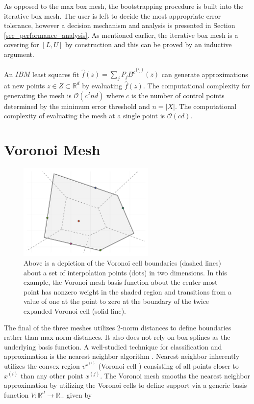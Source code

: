As opposed to the max box mesh, the bootstrapping procedure is built into the iterative box mesh. The user is left to decide the most appropriate error tolerance, however a decision mechanism and analysis is presented in Section \ref{sec_performance_analysis}. As mentioned earlier, the iterative box mesh is a covering for $[L,U]$ by construction and this can be proved by an inductive argument.

An $IBM$ least squares fit $\hat f(z) = \sum_{j}P_j B^{c^{(i_j)}}(z)$ can generate approximations at new points $z \in Z \subset \mathbb{R}^d$ by evaluating $\hat f(z)$. The computational complexity for generating the mesh is $\mathcal{O}(c^2 n d)$ where $c$ is the number of control points determined by the minimum error threshold and $n = |X|$. The computational complexity of evaluating the mesh at a single point is $\mathcal{O}(c d)$.

\section{Voronoi Mesh}


\begin{figure}
  \centering
  \includegraphics[width=0.6\textwidth,]{Figures/NA/VM_Construction.pdf}
  \caption{Above is a depiction of the Voronoi cell
    boundaries (dashed lines) about a set of interpolation points
    (dots) in two dimensions. In this example, the Voronoi mesh basis
    function about the center most point has nonzero weight in the
    shaded region and transitions from a value of one at the point to
    zero at the boundary of the twice expanded Voronoi cell (solid
    line).
  \vspace{-.1cm}}
  \label{fig:voronoi-basis}
\end{figure}

The final of the three meshes utilizes 2-norm distances to define boundaries rather than max norm distances. It also does not rely on box splines as the underlying basis function. A well-studied technique for classification and approximation is the nearest neighbor algorithm \cite{cover1967nearest}. Nearest neighbor inherently utilizes the convex region $v^{x^{(i)}}$ (Voronoi cell \cite{dirichlet1850reduction}) consisting of all points closer to $x^{(i)}$ than any other point $x^{(j)}$. The Voronoi mesh smooths the nearest neighbor approximation by utilizing the Voronoi cells to define support via a generic basis function $V: \mathbb{R}^d \rightarrow \mathbb{R}_+$ given by

